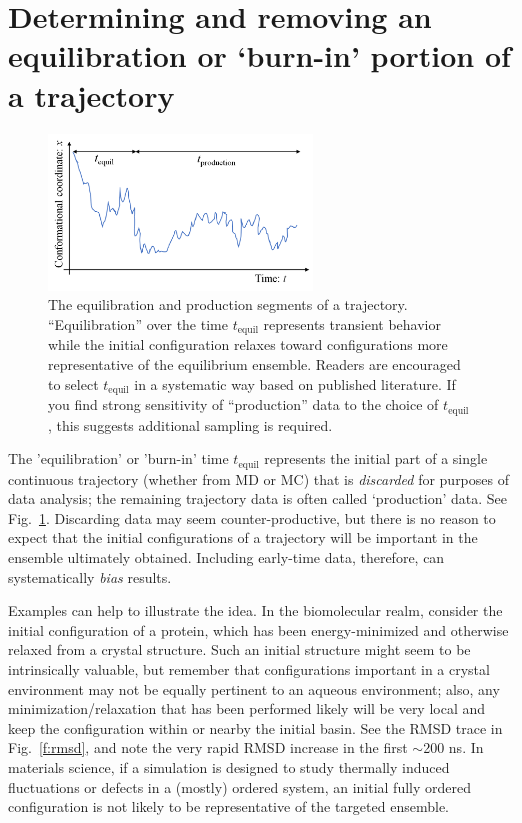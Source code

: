 \section{Determining and removing an equilibration or `burn-in' portion of a trajectory}
\label{sec:equil}

\begin{figure}
  \centering
  \includegraphics[width=7cm]{figures/tequil-time-trace}
  \caption{
  \label{fig:tequil} 
  The equilibration and production segments of a trajectory.
  ``Equilibration'' over the time $t_{\mathrm{equil}}$ represents transient behavior while the initial configuration relaxes toward configurations more representative of the equilibrium ensemble.
  Readers are encouraged to select $t_{\mathrm{equil}}$ in a systematic way based on published literature.
  If you find strong sensitivity of ``production'' data to the choice of $t_{\mathrm{equil}}$, this suggests additional sampling is required.
  }
\end{figure}

The 'equilibration' or 'burn-in' time $t_{\mathrm{equil}}$ represents the initial part of a single continuous trajectory (whether from MD or MC) that is \emph{discarded} for purposes of data analysis; 
the remaining trajectory data is often called `production' data.
See Fig.\ \ref{fig:tequil}.
Discarding data may seem counter-productive, but there is no reason to expect that the initial configurations of a trajectory will be important in the ensemble ultimately obtained.
Including early-time data, therefore, can systematically \emph{bias} results.

Examples can help to illustrate the idea.
In the biomolecular realm, consider the initial configuration of a protein, which has been energy-minimized and otherwise relaxed from a crystal structure.
Such an initial structure might seem to be intrinsically valuable, but remember that configurations important in a crystal environment may not be equally pertinent to an aqueous environment;
also, any minimization/relaxation that has been performed likely will be very local and keep the configuration within or nearby the initial basin.
See the RMSD trace in Fig.\ \ref{f:rmsd}, and note the very rapid RMSD increase in the first $\sim$200 ns.
In materials science, if a simulation is designed to study thermally induced fluctuations or defects in a (mostly) ordered system, 
an initial fully ordered configuration is not likely to be representative of the targeted ensemble.

